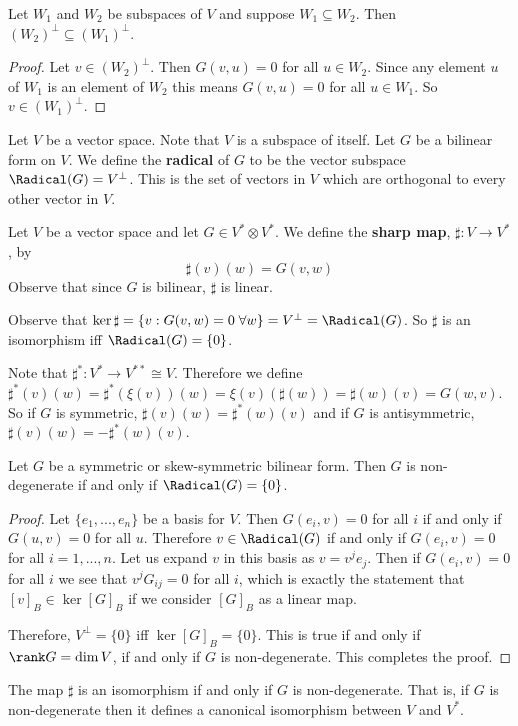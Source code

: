 \begin{lemma}
    Let $W_1$ and $W_2$ be subspaces of $V$ and suppose $W_1\subseteq W_2$. Then $(W_2)^\perp \subseteq (W_1)^\perp$.
\end{lemma}
\begin{proof}
    Let $v \in (W_2)^\perp$. Then $G(v,u)=0$ for all $u \in W_2$. Since any element $u$ of $W_1$ is an element of $W_2$ this means $G(v,u)=0$ for all $u \in W_1$. So $v \in (W_1)^\perp$.
\end{proof}
\begin{defn}[Radical] Let $V$ be a vector space. Note that $V$ is a subspace of itself. Let $G$ be a bilinear form on $V$. We define the \textbf{radical} of $G$ to be the vector subspace $\Radical(G) = V^\perp$. This is the set of vectors in $V$ which are orthogonal to every other vector in $V$.
\end{defn}

\begin{defn} Let $V$ be a vector space and let $G \in V^* \otimes V^*$. We define the \textbf{sharp map}, $\sharp : V \to V^*$, by
    \begin{equation}
        \sharp(v)(w) = G(v,w)
    \end{equation}
    Observe that since $G$ is bilinear, $\sharp$ is linear.
\end{defn}
Observe that $\ker \sharp = \{v : G(v,w) = 0\;\forall w\} = V^\perp = \Radical(G)$. So
$\sharp$ is an isomorphism iff $\Radical(G)=\{0\}$.
\begin{remark*}
    Note that $\sharp^* : V^* \to V^{**} \cong V$. Therefore we define $\sharp^*(v)(w) = \sharp^*(\xi(v))(w)= \xi(v)(\sharp(w)) =\sharp(w)(v)= G(w,v)$. So if $G$ is symmetric, $\sharp(v)(w)=\sharp^*(w)(v)$ and if $G$ is antisymmetric, $\sharp(v)(w)=-\sharp^*(w)(v)$.
\end{remark*}
\begin{thm}
    Let $G$ be a symmetric or skew-symmetric bilinear form. Then $G$ is non-degenerate if and only if $\Radical(G) = \{0\}$.
\end{thm}
\begin{proof}
    Let $\{e_1,...,e_n\}$ be a basis for $V$. Then $G(e_i,v)=0$ for all $i$ if and only if $G(u,v)=0$ for all $u$. Therefore $v \in \Radical(G)$ if and only if $G(e_i,v)=0$ for all $i=1,...,n$. Let us expand $v$ in this basis as $v = v^je_j$. Then if $G(e_i,v) =0$ for all $i$ we see that $v^j G_{ij} = 0$ for all $i$, which is exactly the statement that $[v]_B \in \ker [G]_B$ if we consider $[G]_B$ as a linear map. 

    Therefore, $V^\perp = \{0\}$ iff $\ker [G]_B = \{0\}$. This is true if and only if $\rank G = \dim V$, if and only if $G$ is non-degenerate. This completes the proof.
\end{proof}
\begin{cor}
    The map $\sharp$ is an isomorphism if and only if $G$ is non-degenerate. That is, if $G$ is non-degenerate then it defines a canonical isomorphism between $V$ and $V^*$.
\end{cor}
